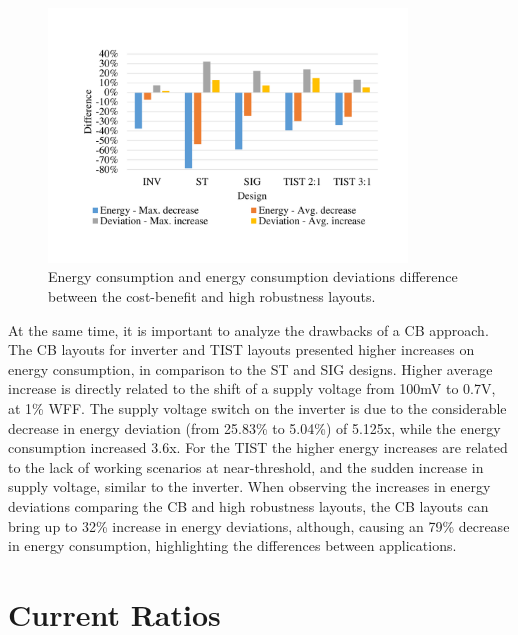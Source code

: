 \documentclass[pgmicro,diss,english]{iiufrgs}
\begin{document}
\begin{figure}[H]
	\centering
        \caption{Energy consumption and energy consumption deviations difference between the cost-benefit and high robustness layouts. \label{CBCompHR}}
      	\includegraphics[width=0.85\textwidth, trim={1.25cm 2cm 2cm 3cm}, clip]{compCB-HR.pdf}
\end{figure}

    At the same time, it is important to analyze the drawbacks of a CB approach. The CB layouts for inverter and TIST layouts presented higher increases on energy consumption, in comparison to the ST and SIG designs. Higher average increase is directly related to the shift of a supply voltage from 100mV to 0.7V, at 1\% WFF. The supply voltage switch on the inverter is due to the considerable decrease in energy deviation (from 25.83\% to 5.04\%) of 5.125x, while the energy consumption increased 3.6x. For the TIST the higher energy increases are related to the lack of working scenarios at near-threshold, and the sudden increase in supply voltage, similar to the inverter. When observing the increases in energy deviations comparing the CB and high robustness layouts, the CB layouts can bring up to 32\% increase in energy deviations, although, causing an 79\% decrease in energy consumption, highlighting the differences between applications.

\section{Current Ratios}

\end{document}
